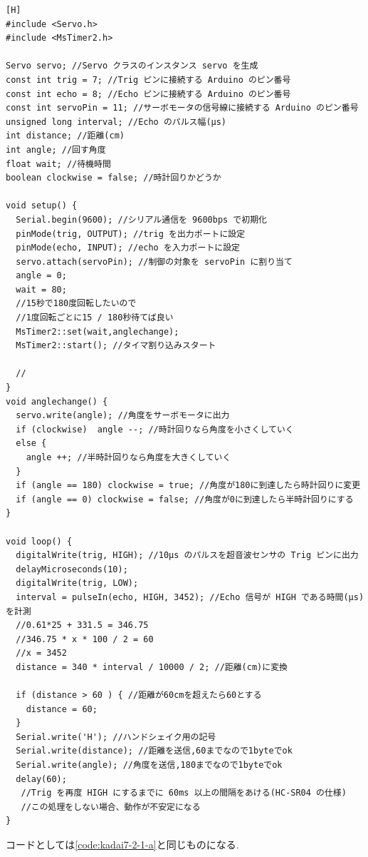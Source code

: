 \documentclass{jarticle}
\begin{document}
\begin{lstlisting}[caption = 発展課題7.2.3(Arduino),label=code:hatten7-2-3-a][H]
#include <Servo.h>
#include <MsTimer2.h>

Servo servo; //Servo クラスのインスタンス servo を生成
const int trig = 7; //Trig ピンに接続する Arduino のピン番号
const int echo = 8; //Echo ピンに接続する Arduino のピン番号
const int servoPin = 11; //サーボモータの信号線に接続する Arduino のピン番号
unsigned long interval; //Echo のパルス幅(μs)
int distance; //距離(cm)
int angle; //回す角度
float wait; //待機時間
boolean clockwise = false; //時計回りかどうか

void setup() {
  Serial.begin(9600); //シリアル通信を 9600bps で初期化
  pinMode(trig, OUTPUT); //trig を出力ポートに設定
  pinMode(echo, INPUT); //echo を入力ポートに設定
  servo.attach(servoPin); //制御の対象を servoPin に割り当て
  angle = 0;
  wait = 80;
  //15秒で180度回転したいので
  //1度回転ごとに15 / 180秒待てば良い
  MsTimer2::set(wait,anglechange);
  MsTimer2::start(); //タイマ割り込みスタート

  // 
}
void anglechange() {
  servo.write(angle); //角度をサーボモータに出力
  if (clockwise)  angle --; //時計回りなら角度を小さくしていく
  else {
    angle ++; //半時計回りなら角度を大きくしていく
  }
  if (angle == 180) clockwise = true; //角度が180に到達したら時計回りに変更
  if (angle == 0) clockwise = false; //角度が0に到達したら半時計回りにする
}

void loop() {
  digitalWrite(trig, HIGH); //10μs のパルスを超音波センサの Trig ピンに出力
  delayMicroseconds(10);
  digitalWrite(trig, LOW);
  interval = pulseIn(echo, HIGH, 3452); //Echo 信号が HIGH である時間(μs)を計測
  //0.61*25 + 331.5 = 346.75
  //346.75 * x * 100 / 2 = 60
  //x = 3452
  distance = 340 * interval / 10000 / 2; //距離(cm)に変換
  
  if (distance > 60 ) { //距離が60cmを超えたら60とする
    distance = 60;
  } 
  Serial.write('H'); //ハンドシェイク用の記号
  Serial.write(distance); //距離を送信,60までなので1byteでok
  Serial.write(angle); //角度を送信,180までなので1byteでok
  delay(60);
   //Trig を再度 HIGH にするまでに 60ms 以上の間隔をあける(HC-SR04 の仕様)
   //この処理をしない場合、動作が不安定になる
}
\end{lstlisting}
コードとしては\ref{code:kadai7-2-1-a}と同じものになる.
\end{document}
